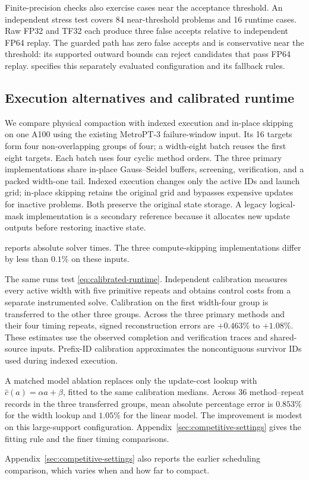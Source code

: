 Finite-precision checks also exercise cases near the acceptance threshold. An independent stress test covers 84 near-threshold problems and 16 runtime cases. Raw FP32 and TF32 each produce three false accepts relative to independent FP64 replay. The guarded path has zero false accepts and is conservative near the threshold: its supported outward bounds can reject candidates that pass FP64 replay.  specifies this separately evaluated configuration and its fallback rules.



\subsection{Execution alternatives and calibrated runtime}
\label{sec:execution-controls}

We compare physical compaction with indexed execution and in-place skipping on one A100 using the existing MetroPT-3 failure-window input. Its 16 targets form four non-overlapping groups of four; a width-eight batch reuses the first eight targets. Each batch uses four cyclic method orders. The three primary implementations share in-place Gauss--Seidel buffers, screening, verification, and a packed width-one tail. Indexed execution changes only the active IDs and launch grid; in-place skipping retains the original grid and bypasses expensive updates for inactive problems. Both preserve the original state storage. A legacy logical-mask implementation is a secondary reference because it allocates new update outputs before restoring inactive state.

 reports absolute solver times. The three compute-skipping implementations differ by less than $0.1\%$ on these inputs.

The same runs test \cref{eq:calibrated-runtime}. Independent calibration measures every active width with five primitive repeats and obtains control costs from a separate instrumented solve. Calibration on the first width-four group is transferred to the other three groups. Across the three primary methods and their four timing repeats, signed reconstruction errors are $+0.463\%$ to $+1.08\%$. These estimates use the observed completion and verification traces and shared-source inputs. Prefix-ID calibration approximates the noncontiguous survivor IDs used during indexed execution.

A matched model ablation replaces only the update-cost lookup with $\widehat c(a)=\alpha a+\beta$, fitted to the same calibration medians. Across 36 method--repeat records in the three transferred groups, mean absolute percentage error is $0.853\%$ for the width lookup and $1.05\%$ for the linear model. The improvement is modest on this large-support configuration. Appendix~\ref{sec:competitive-settings} gives the fitting rule and the finer timing comparisons.

Appendix~\ref{sec:competitive-settings} also reports the earlier scheduling comparison, which varies when and how far to compact.
\FloatBarrier
